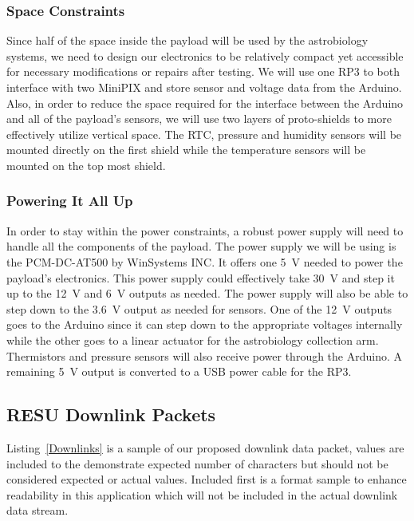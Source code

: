 \subsubsection{Space Constraints}
Since half of the space inside the payload will be used by the astrobiology systems, we need to design our electronics to be relatively compact yet accessible for necessary modifications or repairs after testing. We will use one RP3 to both interface with two MiniPIX and store sensor and voltage data from the Arduino.  Also, in order to reduce the space required for the interface between the Arduino and all of the payload's sensors, we will use two layers of proto-shields to more effectively utilize vertical space. The RTC, pressure and humidity sensors will be mounted directly on the first shield while the temperature sensors will be mounted on the top most shield. 

 \subsubsection{Powering It All Up}

 In order to stay within the power constraints, a robust power supply will need to  handle all the components of the payload.  The power supply we will be using is the PCM-DC-AT500 by WinSystems INC.  It offers one \SI{+5}{\volt} needed to power the payload's electronics.  This power supply could effectively take \SI{+30}{\volt} and step it up to the \SI{+12}{\volt} and \SI{+6}{\volt} outputs as needed. The power supply will also be able to step down to the \SI{+3.6 }{\volt} output as needed for sensors. One of the \SI{+12}{\volt} outputs goes to the Arduino since it can step down to the appropriate voltages internally while the other goes to a linear actuator for the astrobiology collection arm. Thermistors and pressure sensors will also receive power through the Arduino. A remaining \SI{+5 }{\volt} output is converted to a USB power cable for the RP3. 

\subsection{RESU Downlink Packets}

Listing~\ref{Downlinks} is a sample of our proposed downlink data packet, values are included to the demonstrate expected number of characters but should not be considered expected or actual values. Included first is a format sample to enhance readability in this application which will not be included in the actual downlink data stream.


